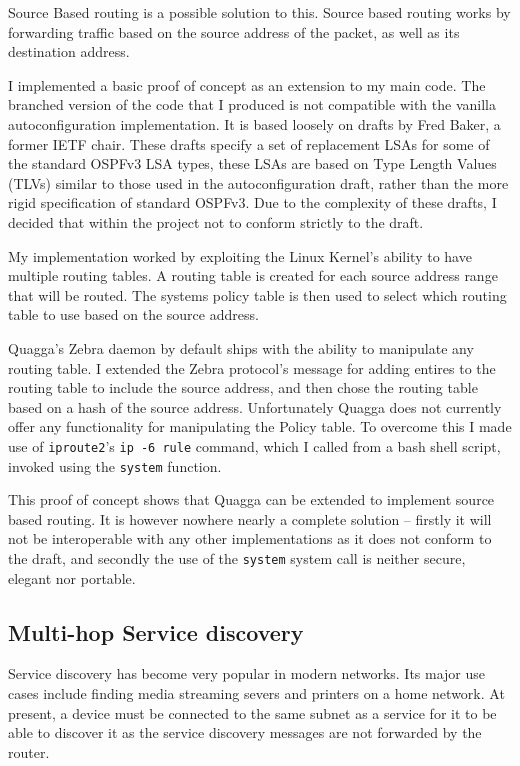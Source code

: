 \documentclass[12pt]{report}
\begin{document}
Source Based routing is a possible solution to this. Source based routing works
by forwarding traffic based on the source address of the packet, as well as its
destination address. 

I implemented a basic proof of concept as an extension to my main code. The
branched version of the code that I produced is not compatible with the vanilla
autoconfiguration implementation. It is based loosely on drafts by Fred Baker,
a former IETF chair. These drafts specify a set of replacement LSAs for some of
the standard OSPFv3 LSA types, these LSAs are based on Type Length Values
(TLVs) similar to those used in the autoconfiguration draft, rather than the
more rigid specification of standard OSPFv3. Due to the complexity of these
drafts, I decided that within the project not to conform strictly to the
draft.

My implementation worked by exploiting the Linux Kernel's ability to have
multiple routing tables. A routing table is created for each source address
range that will be routed. The systems policy table is then used to select
which routing table to use based on the source address.  

Quagga's Zebra daemon by default ships with the ability to manipulate any
routing table. I extended the Zebra protocol's message for adding entires to
the routing table to include the source address, and then chose the routing
table based on a hash of the source address.  Unfortunately Quagga does not
currently offer any functionality for manipulating the Policy table. To
overcome this I made use of \texttt{iproute2}'s \texttt{ip -6 rule} command,
which I called from a bash shell script, invoked using the \texttt{system}
function. 

This proof of concept shows that Quagga can be extended to implement source
based routing. It is however nowhere nearly a complete solution -- firstly it
will not be interoperable with any other implementations as it does not conform
to the draft, and secondly the use of the \texttt{system} system call is
neither secure, elegant nor portable. 

\subsection{Multi-hop Service discovery}
Service discovery has become very popular in modern networks. Its major use
cases include finding media streaming severs and printers on a home network. At
present, a device must be connected to the same subnet as a service for it to
be able to discover it as the service discovery messages are not forwarded by
the router. 
\end{document}
